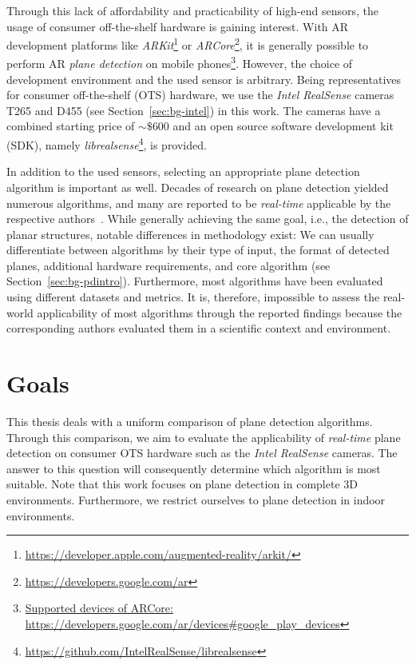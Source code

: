 \documentclass[main.tex]{subfiles}
\begin{document}
Through this lack of affordability and practicability of high-end sensors, the usage of consumer off-the-shelf hardware is gaining interest.
With AR development platforms like \textit{ARKit}\footnote{\href{https://developer.apple.com/augmented-reality/arkit/}{https://developer.apple.com/augmented-reality/arkit/}} or \textit{ARCore}\footnote{\href{https://developers.google.com/ar}{https://developers.google.com/ar}}, it is generally possible to perform AR \textit{plane detection} on mobile phones\footnote{\href{https://developers.google.com/ar/devices\#google\_play\_devices}{Supported devices of ARCore: https://developers.google.com/ar/devices\#google\_play\_devices}}. However, the choice of development environment and the used sensor is arbitrary.
Being representatives for consumer off-the-shelf (OTS) hardware, we use the \textit{Intel RealSense} cameras T265 and D455 (see Section~\ref{sec:bg-intel}) in this work. The cameras have a combined starting price of ${\sim}\$600$ and an open source software development kit (SDK), namely \textit{librealsense}\footnote{\href{https://github.com/IntelRealSense/librealsense}{https://github.com/IntelRealSense/librealsense}}, is provided.

In addition to the used sensors, selecting an appropriate plane detection algorithm is important as well.
Decades of research on plane detection yielded numerous algorithms, and many are reported to be \textit{real-time} applicable by the respective authors~\cite{LimbergerOliveira2015HT3D, Roychoudhury_Missura_Bennewitz_2021_new, Xu_Xie_Chen_Wang_2020, yoohyun,Feng_Taguchi_Kamat_2014}.
While generally achieving the same goal, i.e., the detection of planar structures, notable differences in methodology exist: We can usually differentiate between algorithms by their type of input, the format of detected planes, additional hardware requirements, and core algorithm (see Section~\ref{sec:bg-pdintro}). Furthermore, most algorithms have been evaluated using different datasets and metrics.
It is, therefore, impossible to assess the real-world applicability of most algorithms through the reported findings because the corresponding authors evaluated them in a scientific context and environment.

\section{Goals}
\label{sec:goals}
This thesis deals with a uniform comparison of plane detection algorithms.
Through this comparison, we aim to evaluate the applicability of \textit{real-time} plane detection on consumer OTS hardware such as the \textit{Intel RealSense} cameras. The answer to this question will consequently determine which algorithm is most suitable.
Note that this work focuses on plane detection in complete 3D environments.
Furthermore, we restrict ourselves to plane detection in indoor environments.
\end{document}

